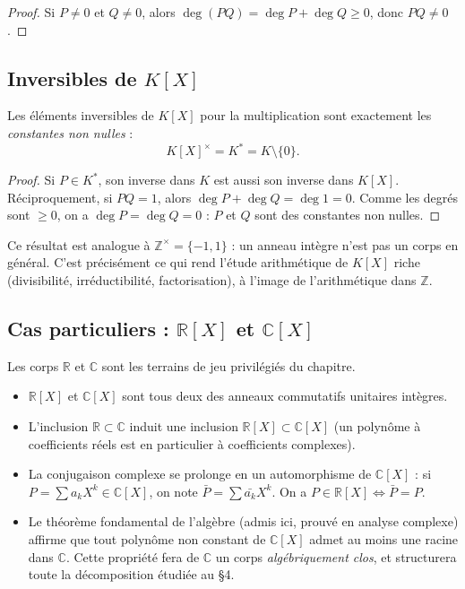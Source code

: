\begin{proof}
Si $P \neq 0$ et $Q \neq 0$, alors $\deg(PQ) = \deg P + \deg Q \ge 0$, donc $PQ \neq 0$.
\end{proof}

\subsection{Inversibles de $K[X]$}

\begin{proposition}[Inversibles]
Les éléments inversibles de $K[X]$ pour la multiplication sont exactement les \emph{constantes non nulles} :
\[ K[X]^\times = K^* = K \setminus \{0\}. \]
\end{proposition}

\begin{proof}
Si $P \in K^*$, son inverse dans $K$ est aussi son inverse dans $K[X]$.
Réciproquement, si $PQ = 1$, alors $\deg P + \deg Q = \deg 1 = 0$. Comme les degrés sont $\ge 0$, on a $\deg P = \deg Q = 0$ : $P$ et $Q$ sont des constantes non nulles.
\end{proof}

\begin{remarque}
Ce résultat est analogue à $\mathbb{Z}^\times = \{-1, 1\}$ : un anneau intègre n'est pas un corps en général. C'est précisément ce qui rend l'étude arithmétique de $K[X]$ riche (divisibilité, irréductibilité, factorisation), à l'image de l'arithmétique dans $\mathbb{Z}$.
\end{remarque}

\subsection{Cas particuliers : $\mathbb{R}[X]$ et $\mathbb{C}[X]$}

Les corps $\mathbb{R}$ et $\mathbb{C}$ sont les terrains de jeu privilégiés du chapitre.

\begin{itemize}
    \item $\mathbb{R}[X]$ et $\mathbb{C}[X]$ sont tous deux des anneaux commutatifs unitaires intègres.
    \item L'inclusion $\mathbb{R} \subset \mathbb{C}$ induit une inclusion $\mathbb{R}[X] \subset \mathbb{C}[X]$ (un polynôme à coefficients réels est en particulier à coefficients complexes).
    \item La conjugaison complexe se prolonge en un automorphisme de $\mathbb{C}[X]$ : si $P = \sum a_k X^k \in \mathbb{C}[X]$, on note $\bar{P} = \sum \bar{a_k} X^k$. On a $P \in \mathbb{R}[X] \iff \bar{P} = P$.
    \item Le théorème fondamental de l'algèbre (admis ici, prouvé en analyse complexe) affirme que tout polynôme non constant de $\mathbb{C}[X]$ admet au moins une racine dans $\mathbb{C}$. Cette propriété fera de $\mathbb{C}$ un corps \emph{algébriquement clos}, et structurera toute la décomposition étudiée au §4.
\end{itemize}

